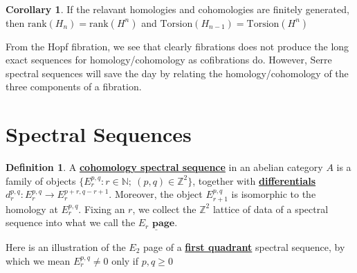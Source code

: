 \documentclass{article}
\theoremstyle{definition}
\theoremstyle{definition}
\theoremstyle{definition}
\theoremstyle{definition}
\newtheorem{definition}{Definition}[theorem]
\theoremstyle{definition}
\newtheorem{corollary}{Corollary}[theorem]
\theoremstyle{definition}
\begin{document}
\begin{tcolorbox}[colback=green!5!white,colframe=green!30!white]
\begin{corollary}
If the relavant homologies and cohomologies are finitely generated, then $\textrm{rank}(H_n)=\textrm{rank}(H^n)$ and $\textrm{Torsion}(H_{n-1})=\textrm{Torsion}(H^n)$
\end{corollary}
\end{tcolorbox}

From the Hopf fibration, we see that clearly fibrations does not produce the long exact sequences for homology/cohomology as cofibrations do. However, Serre spectral sequences will save the day by relating the homology/cohomology of the three components of a fibration. 
\section{Spectral Sequences}



\begin{tcolorbox}[colback=purple!5!white,colframe=purple!75!black]
\begin{definition}
A \underline{\textbf{cohomology spectral sequence}} in an abelian category $A$ is a family of objects $\{E_r^{p,q}: r\in \mathbb{N}; \ (p,q)\in \mathbb{Z}^2\}$, together with \underline{\textbf{differentials}} $d_r^{p,q}: E_r^{p,q}\to E_r^{p+r,q-r+1}$. Moreover, the object $E_{r+1}^{p,q}$ is isomorphic to the homology at $E_r^{p,q}$. Fixing an $r$, we collect the $\mathbb{Z}^2$ lattice of data of a spectral sequence into what we call the $\underline{ E_r \textbf{ page}}$.
\end{definition}
\end{tcolorbox}

Here is an illustration of the $E_2$ page of a \underline{\textbf{first quadrant}} spectral sequence, by which we mean $E_r^{p,q}\neq 0$ only if $p,q\geq 0$


\end{document}
